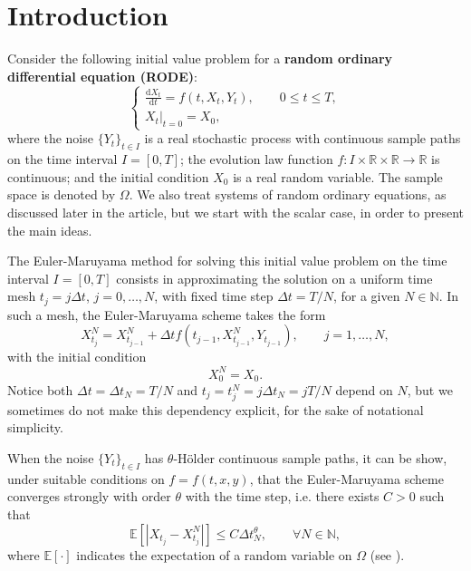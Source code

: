 \documentclass[reqno,12pt]{amsart}
\theoremstyle{plain}%
\theoremstyle{definition}
\begin{document}
\maketitle

\section{Introduction}

Consider the following initial value problem for a \textbf{random ordinary differential equation (RODE)}:
\begin{equation}
  \label{rodeeq}
  \begin{cases}
    \displaystyle \frac{\mathrm{d}X_t}{\mathrm{d} t} = f(t, X_t, Y_t), \qquad 0 \leq t \leq T, \\
    \left. X_t \right|_{t = 0} = X_0,
  \end{cases}
\end{equation}
where the noise $\{Y_t\}_{t\in I}$ is a real stochastic process with continuous sample paths on the time interval $I=[0, T]$; the evolution law function $f:I \times \mathbb{R} \times\mathbb{R} \rightarrow \mathbb{R}$ is continuous; and the initial condition $X_0$ is a real random variable. The sample space is denoted by $\Omega$. We also treat systems of random ordinary equations, as discussed later in the article, but we start with the scalar case, in order to present the main ideas.

The Euler-Maruyama method for solving this initial value problem on the time interval $I = [0, T]$ consists in approximating the solution on a uniform time mesh $t_j = j\Delta t$, $j = 0, \ldots, N$, with fixed time step $\Delta t = T/N$, for a given $N\in \mathbb{N}$. In such a mesh, the Euler-Maruyama scheme takes the form
\begin{equation}
  \label{emscheme}
  X_{t_j}^N = X_{t_{j-1}}^N + \Delta t f(t_{j-1}, X_{t_{j-1}}^N, Y_{t_{j-1}}), \qquad j = 1, \ldots, N,
\end{equation}
with the initial condition
\begin{equation}
  \label{iccondition}
  X_0^N = X_0.
\end{equation}
Notice both $\Delta t = \Delta t_N = T/N$ and $t_j = t_j^N = j\Delta t_N = jT/N$ depend on $N$, but we sometimes do not make this dependency explicit, for the sake of notational simplicity.

When the noise $\{Y_t\}_{t\in I}$ has $\theta$-H\"older continuous sample paths, it can be show, under suitable conditions on $f=f(t, x, y)$, that the Euler-Maruyama scheme converges strongly with order $\theta$ with the time step, i.e. there exists $C > 0$ such that
\begin{equation}
    \mathbb{E}\left[ \left| X_{t_j} - X_{t_j}^N \right| \right] \leq C \Delta t_N^\theta, \qquad \forall N \in \mathbb{N},
\end{equation}
where $\mathbb{E}[\cdot]$ indicates the expectation of a random variable on $\Omega$ (see \cite{}).
\end{document}
